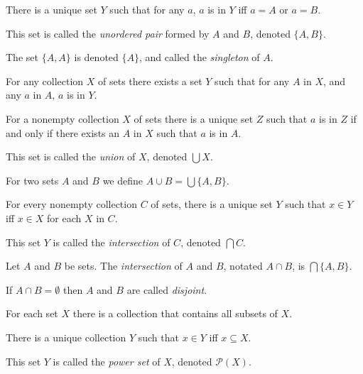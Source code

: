 \begin{prop}
  There is a unique set $Y$ such that for any $a$, $a$ is in $Y$ iff $a=A$ or $a=B$.
\end{prop}
\begin{defn}
  This set is called the \emph{unordered pair} formed by $A$ and $B$, denoted
  $\{A,B\}$.
\end{defn}
\begin{defn}
  The set $\{A,A\}$ is denoted $\{A\}$, and called the \emph{singleton} of
  $A$.
\end{defn}
\begin{axiom}[Union]
  For any collection $X$ of sets there exists a set $Y$ such that for any $A$ in
  $X$, and any $a$ in $A$, $a$ is in $Y$.
\end{axiom}
\begin{prop}
  For a nonempty collection $X$ of sets there is a unique set $Z$ such that $a$
  is in $Z$ if and only if there exists an $A$ in $X$ such that $a$ is in $A$.
\end{prop}
\begin{defn}
  This set is called the \emph{union} of $X$, denoted
  $\bigcup X$.

  For two sets $A$ and $B$ we define $A\cup B=\bigcup \{A,B\}$.
\end{defn}
\begin{prop}
  For every nonempty collection $C$ of sets, there is a unique set $Y$ such that
  $x\in Y$ iff $x\in X$ for each $X$ in $C$.
\end{prop}
\begin{defn}
  This set $Y$ is called the \emph{intersection} of $C$, denoted $\bigcap C$.
\end{defn}
\begin{defn}
  Let $A$ and $B$ be sets.
  The \emph{intersection} of $A$ and $B$, notated $A\cap B$, is
  $\bigcap\{A,B\}$.

  If $A\cap B=\emptyset$ then $A$ and $B$ are called \emph{disjoint}.
\end{defn}
\begin{axiom}[Powers]
  For each set $X$ there is a collection that contains all subsets of $X$.
\end{axiom}
\begin{prop}
  There is a unique collection $Y$ such that $x\in Y$ iff $x\subseteq X$.
\end{prop}
\begin{defn}
  This set $Y$ is called the \emph{power set} of $X$, denoted $\mathcal P(X)$.
\end{defn}
